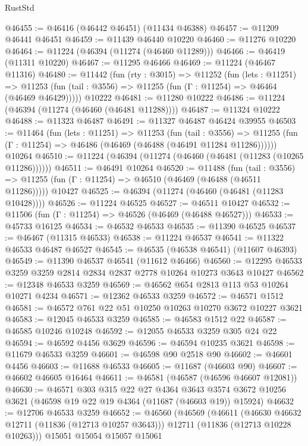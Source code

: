 \begin{lexlean}{RustStd}
\begin{coremodule}
@46455 := @46416 (@46442 @46451) (@11434 @46388)
@46457 := @11209 @46441 @46451
@46459 := @11439 @46440 @10220
@46460 := @11276 @10220
@46464 := @11224 (@46394 (@11274 (@46460 @11289)))
@46466 := @46419 (@11311 @10220)
@46467 := @11295 @46466
@46469 := @11224 (@46467 @11316)
@46480 := @11442
    (fun (rty : @3015) =>
    @11252
      (fun (lets : @11251) =>
      @11253 (fun (tail : @3556) => @11255 (fun (Γ : @11254) => @46464 (@46469 @46429)))))
    @10222
@46481 := @11280 @10222
@46486 := @11224 (@46394 (@11274 (@46460 (@46481 @11288))))
@46487 := @11324 @10222
@46488 := @11323 @46487
@46491 := @11327 @46487 @46424 @39955
@46503 := @11464
    (fun (lets : @11251) =>
    @11253
      (fun (tail : @3556) =>
      @11255 (fun (Γ : @11254) => @46486 (@46469 (@46488 (@46491 @11284 @11286))))))
    @10264
@46510 := @11224 (@46394 (@11274 (@46460 (@46481 (@11283 (@10265 @11286))))))
@46511 := @46491 @10264
@46520 := @11488
    (fun (tail : @3556) => @11255 (fun (Γ : @11254) => @46510 (@46469 (@46488 (@46511 @11286)))))
    @10427
@46525 := @46394 (@11274 (@46460 (@46481 (@11283 @10428))))
@46526 := @11224 @46525
@46527 := @46511 @10427
@46532 := @11506 (fun (Γ : @11254) => @46526 (@46469 (@46488 @46527)))
@46533 := @45733 @16125
@46534 := @46532 @46533
@46535 := @11390 @46525
@46537 := @46467 (@11315 @46533)
@46538 := @11224 @46537
@46541 := @11322 @46533 @46487 @46527
@46545 := @46535 (@46538 @46541) (@11607 @46393)
@46549 := @11390 @46537 @46541 (@11612 @46466)
@46560 := @12295 @46533 @3259 @3259 @2814 @2834 @2837 @2778 @10264 @10273 @3643 @10427
@46562 := @12348 @46533 @3259
@46569 := @46562 @654 @2813 @113 @53 @10264 @10271 @4234
@46571 := @12362 @46533 @3259
@46572 := @46571 @1512
@46581 := @46572 @761 @22 @51 @10250 @10263 @10270 @3672 @10227 @3621
@46583 := @12045 @46533 @3259
@46585 := @46583 @1512 @22
@46587 := @46585 @10246 @10248
@46592 := @12055 @46533 @3259 @305 @24 @22
@46594 := @46592 @4456 @3629
@46596 := @46594 @10235 @3621
@46598 := @11679 @46533 @3259
@46601 := @46598 @90 @2518 @90
@46602 := @46601 @4456
@46603 := @11688 @46533
@46605 := @11687 (@46603 @90)
@46607 := @46602 @46605 @16464
@46611 := @46581 (@46587 (@46596 @46607 @12081))
@46630 := @46571
    @303
    @315
    @22
    @27
    @4364
    @3643
    @3574
    @3672
    @10256
    @3621
    (@46598 @19 @22 @19 @4364 (@11687 (@46603 @19)) @15924)
@46632 := @12706 @46533 @3259
@46652 := @46560
    (@46569
      (@46611
        (@46630 @46632 @12711 (@11836 (@12713 @10257 @3643)))
        @12711
        (@11836 (@12713 @10228 @10263)))
      @15051
      @15054
      @15057
      @15061

\end{coremodule}
\end{lexlean}
